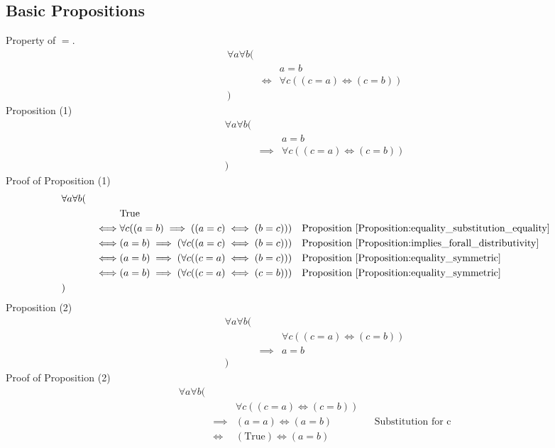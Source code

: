\subsection{Basic Propositions}
\begin{prop}
\label{Proposition:equality_property_1}
Property of $=$.
\begin{align*}
& \forall a \forall b ( \\
& & & a = b \\
& & \iff & \forall c ((c = a) \iff (c = b)) \\
& )
\end{align*}
Proposition (1)
\begin{align*}
& \forall a \forall b ( \\
& & & a = b \\
& & \implies & \forall c ((c = a) \iff (c = b)) \\
& )
\end{align*}
Proof of Proposition (1)
\begin{align*}
& \forall a \forall b ( \\
& & & \text{True} \\
& & \iff & \forall c ((a = b) \implies ((a = c) \iff (b = c)))
& & \text{Proposition \ref{Proposition:equality_substitution_equality}} \\
& & \iff & (a = b) \implies (\forall c ((a = c) \iff (b = c)))
& & \text{Proposition \ref{Proposition:implies_forall_distributivity}} \\
& & \iff & (a = b) \implies (\forall c ((c = a) \iff (b = c)))
& & \text{Proposition \ref{Proposition:equality_symmetric}} \\
& & \iff & (a = b) \implies (\forall c ((c = a) \iff (c = b)))
& & \text{Proposition \ref{Proposition:equality_symmetric}} \\
& )
\end{align*}
Proposition (2)
\begin{align*}
& \forall a \forall b ( \\
& & & \forall c ((c = a) \iff (c = b)) \\
& & \implies & a = b \\
& )
\end{align*}
Proof of Proposition (2)
\begin{align*}
& \forall a \forall b ( \\
& & & \forall c ((c = a) \iff (c = b)) \\
& & \implies & (a = a) \iff (a = b)
& & \text{Substitution for c} \\
& & \iff & (\text{True}) \iff (a = b)

\end{align*}
\end{prop}
